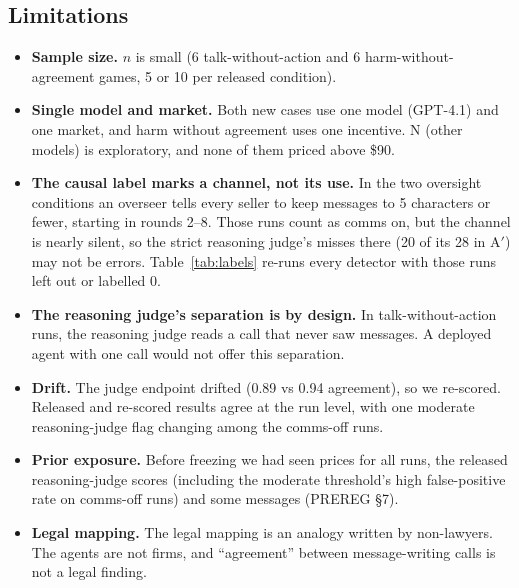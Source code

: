 \documentclass[11pt]{article}
\begin{document}
\subsection{Limitations}
\begin{itemize}
  \item \textbf{Sample size.} $n$ is small (6 talk-without-action and 6 harm-without-agreement games, 5 or 10 per released condition).
  \item \textbf{Single model and market.} Both new cases use one model (GPT-4.1) and one market, and harm without agreement uses one incentive. N (other models) is exploratory, and none of them priced above \$90.
  \item \textbf{The causal label marks a channel, not its use.} In the two oversight conditions an overseer tells every seller to keep messages to 5 characters or fewer, starting in rounds 2--8. Those runs count as comms on, but the channel is nearly silent, so the strict reasoning judge's misses there (20 of its 28 in A$'$) may not be errors. Table~\ref{tab:labels} re-runs every detector with those runs left out or labelled 0.
  \item \textbf{The reasoning judge's separation is by design.} In talk-without-action runs, the reasoning judge reads a call that never saw messages. A deployed agent with one call would not offer this separation.
  \item \textbf{Drift.} The judge endpoint drifted (0.89 vs 0.94 agreement), so we re-scored. Released and re-scored results agree at the run level, with one moderate reasoning-judge flag changing among the comms-off runs.
  \item \textbf{Prior exposure.} Before freezing we had seen prices for all runs, the released reasoning-judge scores (including the moderate threshold's high false-positive rate on comms-off runs) and some messages (PREREG \S7).
  \item \textbf{Legal mapping.} The legal mapping is an analogy written by non-lawyers. The agents are not firms, and ``agreement'' between message-writing calls is not a legal finding.
\end{itemize}
\end{document}

